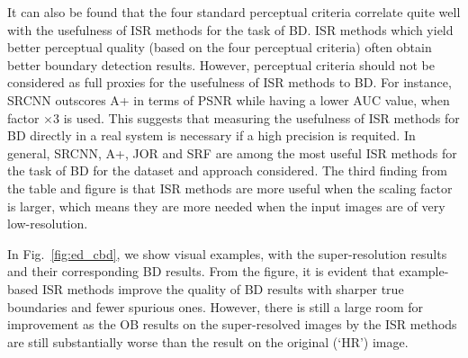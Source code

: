 It can also be found that the four standard perceptual criteria
correlate quite well with the usefulness of ISR methods for the task
of BD. ISR methods which yield better perceptual quality (based on the
four perceptual criteria) often obtain better boundary detection
results.  However, perceptual criteria should not be considered as full proxies for the
 usefulness of ISR methods to BD. For
instance, SRCNN outscores A+ in terms of PSNR while having a lower AUC
value, when factor $\times$3 is used. This suggests that measuring the
usefulness of ISR methods for BD directly in a real system is
necessary if a high precision is requited. In general, SRCNN, A+, JOR and SRF are 
among the most useful ISR methods for the task of BD for
the dataset and approach considered. The third finding from the table
and figure is that ISR methods are more useful when the scaling factor
is larger, which means they are more needed when the input images
are of very low-resolution.

In Fig.~\ref{fig:ed_cbd}, we show visual examples, with the
super-resolution results and their corresponding BD results. From the
figure, it is evident that example-based ISR methods improve the
quality of BD results with sharper true boundaries and fewer spurious
ones. However, there is still a large room for improvement as the OB
results on the super-resolved images by the ISR methods are still
substantially worse than the result on the original (`HR') image.



